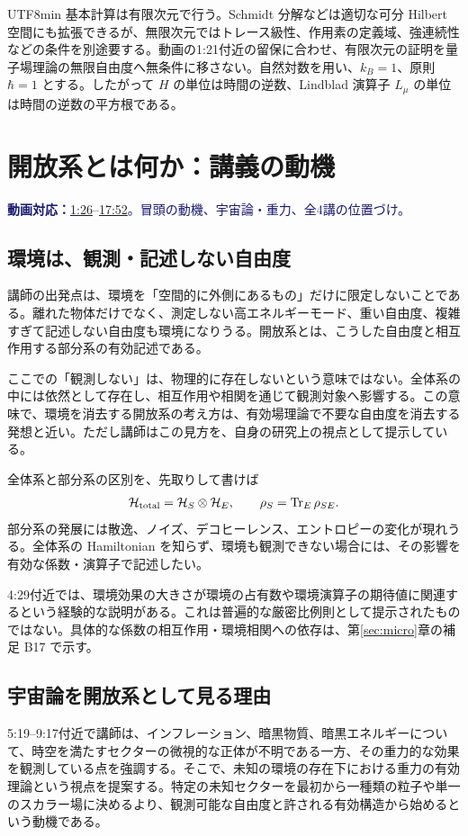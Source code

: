 \documentclass[11pt,a4paper]{article}
\numberwithin{equation}{section}
\newcommand{\Tr}{\operatorname{Tr}}
\newcommand{\vid}[2]{\href{https://www.youtube.com/watch?v=3gDSaNy1O7Y\&t=#1s}{#2}}
\newcommand{\source}[1]{\par\noindent\textcolor{MidnightBlue}{\textbf{動画対応：}#1}\par}
\begin{document}
\begin{CJK*}{UTF8}{min}
基本計算は有限次元で行う。Schmidt 分解などは適切な可分 Hilbert 空間にも拡張できるが、無限次元ではトレース級性、作用素の定義域、強連続性などの条件を別途要する。動画の1:21付近の留保に合わせ、有限次元の証明を量子場理論の無限自由度へ無条件に移さない。自然対数を用い、$k_B=1$、原則 $\hbar=1$ とする。したがって $H$ の単位は時間の逆数、Lindblad 演算子 $L_\mu$ の単位は時間の逆数の平方根である。

\section{開放系とは何か：講義の動機}
\label{sec:motivation}
\source{\vid{86}{1:26}--\vid{1072}{17:52}。冒頭の動機、宇宙論・重力、全4講の位置づけ。}
\subsection{環境は、観測・記述しない自由度}
講師の出発点は、環境を「空間的に外側にあるもの」だけに限定しないことである。離れた物体だけでなく、測定しない高エネルギーモード、重い自由度、複雑すぎて記述しない自由度も環境になりうる。開放系とは、こうした自由度と相互作用する部分系の有効記述である。

ここでの「観測しない」は、物理的に存在しないという意味ではない。全体系の中には依然として存在し、相互作用や相関を通じて観測対象へ影響する。この意味で、環境を消去する開放系の考え方は、有効場理論で不要な自由度を消去する発想と近い。ただし講師はこの見方を、自身の研究上の視点として提示している。

全体系と部分系の区別を、先取りして書けば
\begin{equation}
\mathcal H_{\rm total}=\mathcal H_S\otimes\mathcal H_E,
\qquad \rho_S=\Tr_E\rho_{SE}.
\label{eq:split-preview}
\end{equation}
部分系の発展には散逸、ノイズ、デコヒーレンス、エントロピーの変化が現れうる。全体系の Hamiltonian を知らず、環境も観測できない場合には、その影響を有効な係数・演算子で記述したい。

4:29付近では、環境効果の大きさが環境の占有数や環境演算子の期待値に関連するという経験的な説明がある。これは普遍的な厳密比例則として提示されたものではない。具体的な係数の相互作用・環境相関への依存は、第\ref{sec:micro}章の補足 B17 で示す。

\subsection{宇宙論を開放系として見る理由}
5:19--9:17付近で講師は、インフレーション、暗黒物質、暗黒エネルギーについて、時空を満たすセクターの微視的な正体が不明である一方、その重力的な効果を観測している点を強調する。そこで、未知の環境の存在下における重力の有効理論という視点を提案する。特定の未知セクターを最初から一種類の粒子や単一のスカラー場に決めるより、観測可能な自由度と許される有効構造から始めるという動機である。


\end{CJK*}
\end{document}
